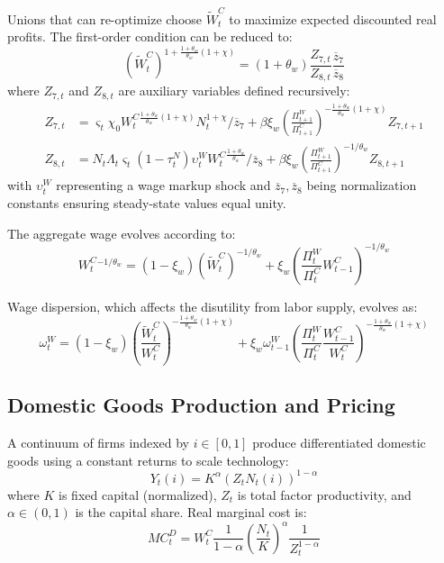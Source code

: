 \documentclass[12pt]{article}
\begin{document}
Unions that can re-optimize choose $\tilde{W}_t^C$ to maximize expected discounted real profits. The first-order condition can be reduced to:
\begin{equation}
(\tilde{W}_t^C)^{1 + \frac{1+\theta_w}{\theta_w}(1+\chi)} = (1+\theta_w) \frac{Z_{7,t}}{Z_{8,t}} \frac{\overline{z}_7}{\overline{z}_8}
\end{equation}
where $Z_{7,t}$ and $Z_{8,t}$ are auxiliary variables defined recursively:
\begin{align}
Z_{7,t} &= \varsigma_t \chi_0 W_t^C{}^{\frac{1+\theta_w}{\theta_w}(1+\chi)} N_t^{1+\chi} / \overline{z}_7 + \beta \xi_w \left( \frac{\Pi_{t+1}^W}{\Pi_{t+1}^C} \right)^{-\frac{1+\theta_w}{\theta_w}(1+\chi)} Z_{7,t+1} \label{eq:z7}\\
Z_{8,t} &= N_t \Lambda_t \varsigma_t (1-\tau_t^N) \upsilon_t^W W_t^C{}^{\frac{1+\theta_w}{\theta_w}} / \overline{z}_8 + \beta \xi_w \left( \frac{\Pi_{t+1}^W}{\Pi_{t+1}^C} \right)^{-1/\theta_w} Z_{8,t+1} \label{eq:z8}
\end{align}
with $\upsilon_t^W$ representing a wage markup shock and $\overline{z}_7, \overline{z}_8$ being normalization constants ensuring steady-state values equal unity.

The aggregate wage evolves according to:
\begin{equation}
W_t^C{}^{-1/\theta_w} = (1-\xi_w) (\tilde{W}_t^C)^{-1/\theta_w} + \xi_w \left( \frac{\Pi_t^W}{\Pi_t^C} W_{t-1}^C \right)^{-1/\theta_w}
\end{equation}

Wage dispersion, which affects the disutility from labor supply, evolves as:
\begin{equation}
\omega_t^W = (1-\xi_w) \left( \frac{\tilde{W}_t^C}{W_t^C} \right)^{-\frac{1+\theta_w}{\theta_w}(1+\chi)} + \xi_w \omega_{t-1}^W \left( \frac{\Pi_t^W}{\Pi_t^C} \frac{W_{t-1}^C}{W_t^C} \right)^{-\frac{1+\theta_w}{\theta_w}(1+\chi)}
\end{equation}

\subsection{Domestic Goods Production and Pricing}

A continuum of firms indexed by $i \in [0,1]$ produce differentiated domestic goods using a constant returns to scale technology:
\begin{equation}
Y_t(i) = K^\alpha (Z_t N_t(i))^{1-\alpha}
\end{equation}
where $K$ is fixed capital (normalized), $Z_t$ is total factor productivity, and $\alpha \in (0,1)$ is the capital share. Real marginal cost is:
\begin{equation}\label{eq:mc}
MC_t^D = W_t^C \frac{1}{1-\alpha} \left(\frac{N_t}{K}\right)^\alpha \frac{1}{Z_t^{1-\alpha}}
\end{equation}
\end{document}
